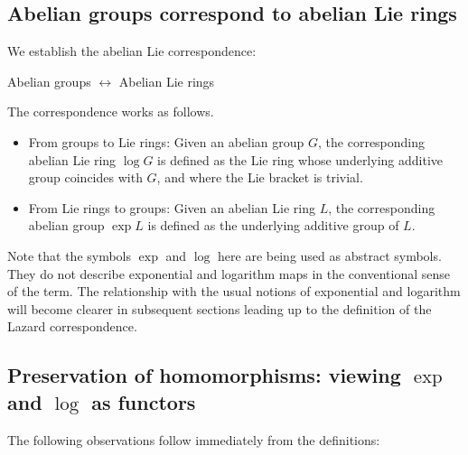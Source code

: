 \subsection{Abelian groups correspond to abelian Lie rings}\label{sec:abelian-lie-correspondence-def}

We establish the abelian Lie correspondence:

\begin{center}
  Abelian groups $\leftrightarrow$ Abelian Lie rings
\end{center}

The correspondence works as follows.

\begin{itemize}
\item From groups to Lie rings: Given an abelian group $G$, the
  corresponding abelian Lie ring $\log G$ is defined as the Lie ring whose
  underlying additive group coincides with $G$, and where the Lie
  bracket is trivial.
\item From Lie rings to groups: Given an abelian Lie ring $L$, the
  corresponding abelian group $\exp L$ is defined as the underlying
  additive group of $L$.
\end{itemize}

Note that the symbols $\exp$ and $\log$ here are being used as
abstract symbols. They do not describe exponential and logarithm
maps in the conventional sense of the term. The relationship with the
usual notions of exponential and logarithm will become clearer in
subsequent sections leading up to the definition of the Lazard
correspondence.

\subsection{Preservation of homomorphisms: viewing $\exp$ and $\log$ as functors}\label{sec:abelian-lie-correspondence-homomorphism-preservation}

The following observations follow immediately from the definitions:

